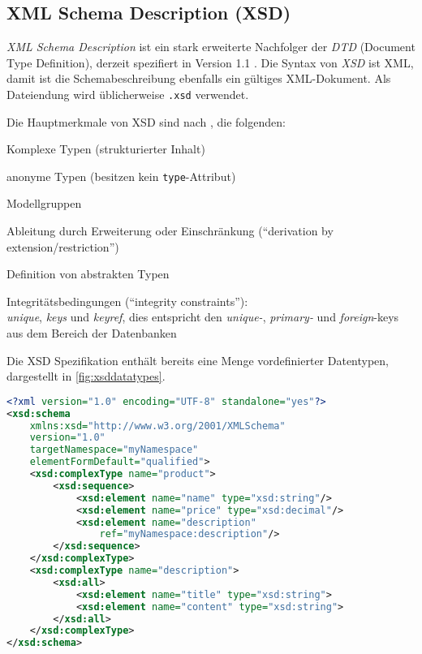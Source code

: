 \subsection{XML Schema Description (XSD)}
\label{sec:xsd}

\emph{XML Schema Description} ist ein stark erweiterte Nachfolger der \emph{DTD} (Document Type Definition), derzeit spezifiert in Version 1.1 \cite{XMLSchema11Specification}. 
Die Syntax von \emph{XSD} ist XML, damit ist die Schemabeschreibung ebenfalls ein gültiges XML-Dokument. Als Dateiendung wird üblicherweise \texttt{.xsd} verwendet.

Die Hauptmerkmale von XSD sind nach \cite{taxonomyXMLSchema} %
, die folgenden:
\begin{compactitem}
    \item Komplexe Typen (strukturierter Inhalt)
    \item anonyme Typen (besitzen kein \texttt{type}-Attribut)
    \item Modellgruppen
    \item Ableitung durch Erweiterung oder Einschränkung (\enquote{derivation by extension/restriction})
    \item Definition von abstrakten Typen
    \item Integritätsbedingungen (\enquote{integrity constraints}):\\
        \emph{unique}, \emph{keys} und \emph{keyref}, dies entspricht den \emph{unique-}, \emph{primary-} und \emph{foreign}-keys aus dem Bereich der Datenbanken
\end{compactitem}

Die XSD Spezifikation enthält bereits eine Menge vordefinierter Datentypen, dargestellt in \cref{fig:xsddatatypes}.

\begin{lstlisting}[language=XML, caption=Minimalbeispiel für eine Schemabeschreibung mit XSD, label=lst:minimalXSD]
<?xml version="1.0" encoding="UTF-8" standalone="yes"?>
<xsd:schema 
    xmlns:xsd="http://www.w3.org/2001/XMLSchema"
    version="1.0" 
    targetNamespace="myNamespace" 
    elementFormDefault="qualified">
    <xsd:complexType name="product">
        <xsd:sequence>
            <xsd:element name="name" type="xsd:string"/>
            <xsd:element name="price" type="xsd:decimal"/>
            <xsd:element name="description"
                ref="myNamespace:description"/>
        </xsd:sequence>
    </xsd:complexType>
    <xsd:complexType name="description">
        <xsd:all>
            <xsd:element name="title" type="xsd:string">
            <xsd:element name="content" type="xsd:string">
        </xsd:all>
    </xsd:complexType>
</xsd:schema>
\end{lstlisting}

